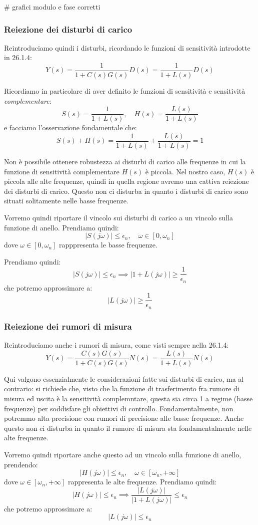 \documentclass[a4paper,11pt]{article}
\begin{document}
# grafici modulo e fase corretti

\subsubsection{Reiezione dei disturbi di carico}

Reintroduciamo quindi i disturbi, ricordando le funzioni di sensitività introdotte in 26.1.4:
$$
Y(s) = \frac{1}{1 + C(s)G(s)}D(s) = \frac{1}{1 + L(s)} D(s)
$$

Ricordiamo in particolare di aver definito le funzioni di sensitività e sensitività \textit{complementare}:
$$
S(s) = \frac{1}{1 + L(s)}, \quad H(s) = \frac{L(s)}{1 + L(s)}
$$
e facciamo l'osservazione fondamentale che:
$$
S(s) + H(s) = \frac{1}{1 + L(s)} + \frac{L(s)}{1 + L(s)} = 1
$$

Non è possibile ottenere robustezza ai disturbi di carico alle frequenze in cui la funzione di sensitività complementare $H(s)$ è piccola.
Nel nostro caso, $H(s)$ è piccola alle alte frequenze, quindi in quella regione avremo una cattiva reiezione dei disturbi di carico.
Questo non ci disturba in quanto i disturbi di carico sono situati solitamente nelle basse frequenze.

Vorremo quindi riportare il vincolo sui disturbi di carico a un vincolo sulla funzione di anello.
Prendiamo quindi:
$$
|S(j\omega)| \leq \epsilon_n, \quad \omega \in [0, \omega_n]
$$
dove $\omega \in [0, \omega_n]$ rapppresenta le basse frequenze.

Prendiamo quindi: 
$$
|S(j\omega)| \leq \epsilon_n \implies |1 + L(j\omega)| \geq \frac{1}{\epsilon_n}
$$
che potremo approssimare a:
$$
|L(j\omega)| \geq \frac{1}{\epsilon_n}
$$

\subsubsection{Reiezione dei rumori di misura}
Reintroduciamo anche i rumori di misura, come visti sempre nella 26.1.4:
$$
Y(s) = \frac{C(s)G(s)}{1 + C(s) G(s)} N(s) = \frac{L(s)}{1 + L(s)} N(s)
$$

Qui valgono essenzialmente le considerazioni fatte sui disturbi di carico, ma al contrario: si richiede che, visto che la funzione di trasferimento fra rumore di misura ed uscita è la sensitività complemntare, questa sia circa 1 a regime (basse frequenze) per soddisfare gli obiettivi di controllo.
Fondamentalmente, non potremmo alta precisione con rumori di precisione alle basse frequenze.
Anche questo non ci disturba in quanto il rumore di misura sta fondamentalmente nelle alte frequenze.

Vorremo quindi riportare anche questo ad un vincolo sulla funzione di anello, prendendo:
$$
|H(j\omega)| \leq \epsilon_n, \quad \omega \in [\omega_n, +\infty]
$$
dove $\omega \in [\omega_n, +\infty]$ rappresenta le alte frequenze.
Prendiamo quindi:
$$
|H(j\omega)| \leq \epsilon_n \implies \frac{|L(j\omega)|}{|1 + L(j\omega)|} \leq \epsilon_n
$$
che potremo approssimare a:
$$
|L(j\omega)| \leq \epsilon_n
$$
\end{document}
